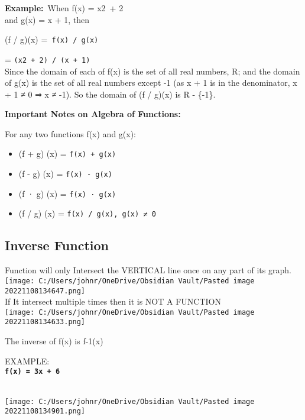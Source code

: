 \documentclass[
]{article}
\providecommand{\tightlist}{%
  \setlength{\itemsep}{0pt}\setlength{\parskip}{0pt}}
\begin{document}
\textbf{Example:}~When f(x) = x2~+ 2\\
and g(x) = x + 1, then

(f / g)(x) =\texttt{\ f(x)\ /\ g(x)}

= \texttt{(x2~+\ 2)\ /\ (x\ +\ 1)}\\
Since the domain of each of f(x) is the set of all real numbers, R; and
the domain of g(x) is the set of all real numbers except -1 (as x + 1 is
in the denominator, x + 1 ≠ 0 ⇒ x ≠ -1). So the domain of (f / g)(x) is
R - \{-1\}.

\textbf{Important Notes on Algebra of Functions:}

For any two functions f(x) and g(x):

\begin{itemize}
\tightlist
\item
  (f + g) (x) = \texttt{f(x)\ +\ g(x)}
\item
  (f - g) (x) = \texttt{f(x)\ -\ g(x)}
\item
  (f · g) (x) = \texttt{f(x)\ ·\ g(x)}
\item
  (f / g) (x) = \texttt{f(x)\ /\ g(x),\ g(x)\ ≠\ 0}
\end{itemize}

\hypertarget{inverse-function}{%
\subsection{Inverse Function}\label{inverse-function}}

Function will only Intersect the VERTICAL line once on any part of its
graph.\\
\texttt{[image: C:/Users/johnr/OneDrive/Obsidian Vault/Pasted image 20221108134647.png]}\\
If It intersect multiple times then it is NOT A FUNCTION\\
\texttt{[image: C:/Users/johnr/OneDrive/Obsidian Vault/Pasted image 20221108134633.png]}

The inverse of f(x) is f-1(x)

EXAMPLE:\\
\textbf{\texttt{f(x)\ =\ 3x\ +\ 6}}\strut \\
\texttt{[image: C:/Users/johnr/OneDrive/Obsidian Vault/Pasted image 20221108134901.png]}
\end{document}
